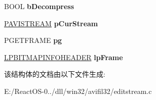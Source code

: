 \begin{DoxyCompactItemize}
\item 
\mbox{\label{struct___i_a_v_i_edit_stream_impl_a0ea23e3b1807e3a4d970d467618a3304}} 
B\+O\+OL {\bfseries b\+Decompress}
\item 
\mbox{\label{struct___i_a_v_i_edit_stream_impl_a1ba41e75b28f5f858010275250f29c42}} 
\hyperlink{interface_i_a_v_i_stream}{P\+A\+V\+I\+S\+T\+R\+E\+AM} {\bfseries p\+Cur\+Stream}
\item 
\mbox{\label{struct___i_a_v_i_edit_stream_impl_af8f397ae3129a3b1ed30dac6e76ee3b4}} 
P\+G\+E\+T\+F\+R\+A\+ME {\bfseries pg}
\item 
\mbox{\label{struct___i_a_v_i_edit_stream_impl_ab2dd3c2c280be3726dc2543596bc8d6b}} 
\hyperlink{struct_b_i_t_m_a_p_i_n_f_o_h_e_a_d_e_r}{L\+P\+B\+I\+T\+M\+A\+P\+I\+N\+F\+O\+H\+E\+A\+D\+ER} {\bfseries lp\+Frame}
\end{DoxyCompactItemize}


该结构体的文档由以下文件生成\+:\begin{DoxyCompactItemize}
\item 
E\+:/\+React\+O\+S-\/0../dll/win32/avifil32/editstream.\+c\end{DoxyCompactItemize}
